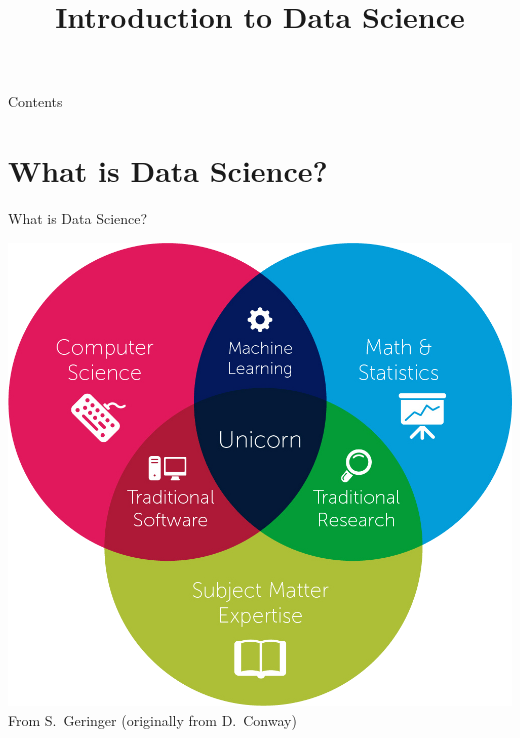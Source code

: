

\title{Introduction to Data Science}



\maketitle

\begin{frame}{Contents}
    \tableofcontents[hideallsubsections]
\end{frame}

\section{What is Data Science?}

\begin{frame}{What is Data Science?}
    \begin{center}
        \includegraphics[height=0.8\textheight]{figures/data_science_venn_diagram} \\
        {\scriptsize%
         From S.\ Geringer (originally from D.\ Conway)}
    \end{center}
\end{frame}

